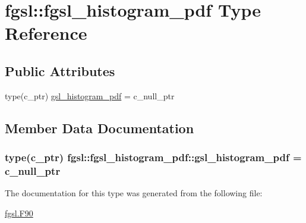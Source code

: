 \hypertarget{structfgsl_1_1fgsl__histogram__pdf}{\section{fgsl\-:\-:fgsl\-\_\-histogram\-\_\-pdf Type Reference}
\label{structfgsl_1_1fgsl__histogram__pdf}
}
\subsection*{Public Attributes}
\begin{DoxyCompactItemize}
\item 
type(c\-\_\-ptr) \hyperlink{structfgsl_1_1fgsl__histogram__pdf_a0d245bc39435c26ab3d37eea9939d5f6}{gsl\-\_\-histogram\-\_\-pdf} = c\-\_\-null\-\_\-ptr
\end{DoxyCompactItemize}


\subsection{Member Data Documentation}
\hypertarget{structfgsl_1_1fgsl__histogram__pdf_a0d245bc39435c26ab3d37eea9939d5f6}{
\subsubsection[{gsl\-\_\-histogram\-\_\-pdf}]{\setlength{\rightskip}{0pt plus 5cm}type(c\-\_\-ptr) fgsl\-::fgsl\-\_\-histogram\-\_\-pdf\-::gsl\-\_\-histogram\-\_\-pdf = c\-\_\-null\-\_\-ptr}}\label{structfgsl_1_1fgsl__histogram__pdf_a0d245bc39435c26ab3d37eea9939d5f6}


The documentation for this type was generated from the following file\-:\begin{DoxyCompactItemize}
\item 
\hyperlink{fgsl_8F90}{fgsl.\-F90}\end{DoxyCompactItemize}
